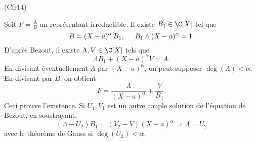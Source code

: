 \begin{tiny}(Cfr14)\end{tiny} Soit $F=\frac{A}{B}$ un représentant irréductible. Il existe $B_1\in \C[X]$ tel que 
\[
 B = (X-a)^\alpha\, B_1, \hspace{0.5cm} B_1 \wedge (X-a)^\alpha = 1.
\]
D'après Bezout, il existe $\Lambda, V \in \C[X]$ tels que
\[
 \Lambda B_1 + (X-a)^\alpha V = A.
\]
En divisant éventuellement $\Lambda$ par $(X-a)^\alpha$, on peut supposer $\deg(\Lambda) < \alpha$. En divisant par $B$, on obtient
\[
 F = \frac{\Lambda}{(X-a)^\alpha} + \frac{V}{B_1}.
\]
Ceci prouve l'existence. Si $U_1, V_1$ est un autre couple solution de l'équation de Bezout, en soustrayant,
\[
 (\Lambda - U_2)B_1 = (V_2 - V)(X-a)^\alpha \Rightarrow \Lambda = U_2
\]
avec le théorème de Gauss si $\deg(U_2) < \alpha$.